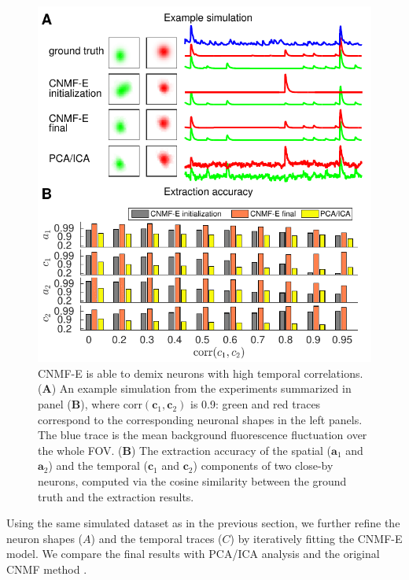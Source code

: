\documentclass[9pt,lineno]{elife}
\begin{document}
\begin{figure}[!t]
  \centering
  \includegraphics[width=1\textwidth]{Fig_SIM_part2.pdf}
  \caption{CNMF-E is able to demix neurons with high temporal correlations. (\textbf{A}) An example simulation from the experiments summarized in panel (\textbf{B}), where $\text{corr}(\bm{c}_1, \bm{c}_2)$ is 0.9: green and red traces correspond to the corresponding neuronal shapes in the left panels. The blue trace is the mean background fluorescence fluctuation over the whole FOV. (\textbf{B}) The extraction accuracy of the spatial ($\bm{a}_1$ and $\bm{a}_2$) and the temporal ($\bm{c}_1$ and $\bm{c}_2$) components of two close-by neurons, computed via the cosine similarity between the ground truth and the extraction results. }
  \label{fig:sim_corr}
\end{figure}


Using the same simulated dataset as in the previous section, we further refine the neuron shapes ($A$) and the temporal traces ($C$) by iteratively fitting the CNMF-E model.  We compare the final results with  PCA/ICA analysis \citep{Mukamel2009} and the original CNMF method \citep{Pnevmatikakis2016}. 
\end{document}
